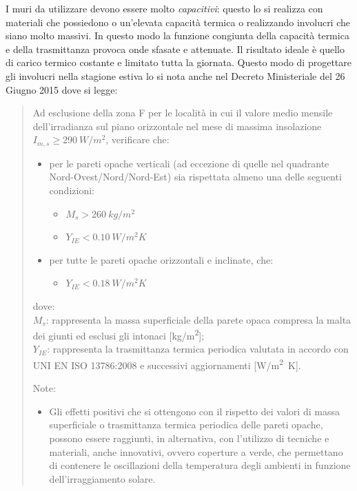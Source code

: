 I muri da utilizzare devono essere molto \emph{capacitivi}: questo lo si realizza con materiali che possiedono o un'elevata capacità termica o realizzando involucri che siano molto massivi. In questo modo la funzione congiunta della capacità termica e della trasmittanza provoca onde sfasate e attenuate. Il risultato ideale è quello di carico termico costante e limitato tutta la giornata. Questo modo di progettare gli involucri nella stagione estiva lo si nota anche nel Decreto Ministeriale del 26 Giugno 2015 dove si legge:
\begin{quote}
	Ad esclusione della zona F per le località in cui il valore medio mensile dell'irradianza sul piano orizzontale nel mese di massima insolazione $I_{m,s} \ge \SI{290}{W/m^2}$, verificare che:
	\begin{itemize}
		\item per le pareti opache verticali (ad eccezione di quelle nel quadrante Nord-Ovest/Nord/Nord-Est) sia rispettata almeno una delle seguenti condizioni:
		\begin{itemize}
			\item $M_s > \SI{260}{kg/m^2}$
			\item $Y_{IE}<\SI{0.10}{W/m^2K}$
		\end{itemize}
		\item per tutte le pareti opache orizzontali e inclinate, che:
		\begin{itemize}
			\item $Y_{IE}<\SI{0.18}{W/m^2K}$
		\end{itemize}
	\end{itemize}
	dove:\\
	$M_s$: rappresenta la massa superficiale della parete opaca compresa la malta dei giunti ed esclusi gli intonaci [\si{kg/m^2}];\\
	$Y_{IE}$: rappresenta la trasmittanza termica periodica valutata in accordo con UNI EN ISO 13786:2008 e successivi aggiornamenti [\si{W/m^2K}].
	
	Note:
	\begin{itemize}
		\item Gli effetti positivi che si ottengono con il rispetto dei valori di massa superficiale o trasmittanza termica periodica delle pareti opache, possono essere raggiunti, in alternativa, con l'utilizzo di tecniche e materiali, anche innovativi, ovvero coperture a verde, che permettano di contenere le oscillazioni della temperatura degli ambienti in funzione dell'irraggiamento solare. \sdots
		
	\end{itemize}
\end{quote}

